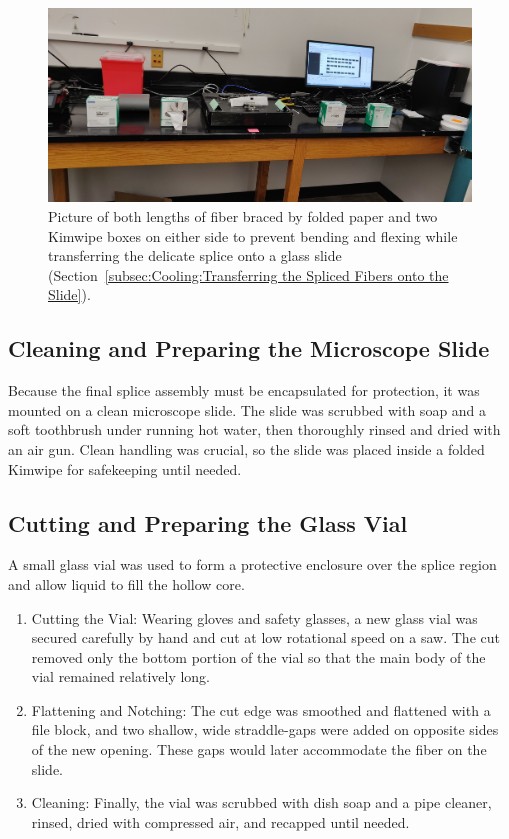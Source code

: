 \begin{figure}[t]
  \centering
  \includegraphics[width=\textwidth]{figs/3-Cooling/doubleBoxBracedSplice.jpg}
  \caption{Picture of both lengths of fiber braced by folded paper and two Kimwipe boxes on either side to prevent bending and flexing while transferring the delicate splice onto a glass slide (Section~\ref{subsec:Cooling:Transferring the Spliced Fibers onto the Slide}).}
  \label{fig:double box braced splice}
\end{figure}

\subsection{Cleaning and Preparing the Microscope Slide}

Because the final splice assembly must be encapsulated for protection, it was mounted on a clean microscope slide. The slide was scrubbed with soap and a soft toothbrush under running hot water, then thoroughly rinsed and dried with an air gun. Clean handling was crucial, so the slide was placed inside a folded Kimwipe for safekeeping until needed.

\subsection{Cutting and Preparing the Glass Vial}

A small glass vial was used to form a protective enclosure over the splice region and allow liquid to fill the hollow core.

\begin{enumerate}
	\item Cutting the Vial: Wearing gloves and safety glasses, a new glass vial was secured carefully by hand and cut at low rotational speed on a saw. The cut removed only the bottom portion of the vial so that the main body of the vial remained relatively long.
	\item Flattening and Notching: The cut edge was smoothed and flattened with a file block, and two shallow, wide straddle-gaps were added on opposite sides of the new opening. These gaps would later accommodate the fiber on the slide.
	\item Cleaning: Finally, the vial was scrubbed with dish soap and a pipe cleaner, rinsed, dried with compressed air, and recapped until needed.
\end{enumerate}

